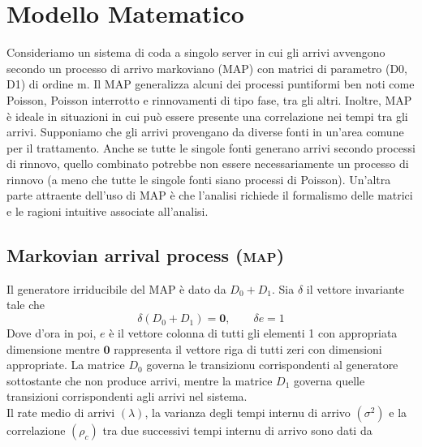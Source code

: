 \documentclass[11pt]{article}
\begin{document}
\clearpage

\section{Modello Matematico}


Consideriamo un sistema di coda a singolo server in cui gli arrivi avvengono secondo un processo di arrivo markoviano (MAP) con matrici di parametro (D0, D1) di ordine m. Il MAP generalizza alcuni dei processi puntiformi ben noti come Poisson, Poisson interrotto e rinnovamenti di tipo fase, tra gli altri. Inoltre, MAP è ideale in situazioni in cui può essere presente una correlazione nei tempi tra gli arrivi. Supponiamo che gli arrivi provengano da diverse fonti in un'area comune per il trattamento. Anche se tutte le singole fonti generano arrivi secondo processi di rinnovo, quello combinato potrebbe non essere necessariamente un processo di rinnovo (a meno che tutte le singole fonti siano processi di Poisson). Un'altra parte attraente dell'uso di MAP è che l'analisi richiede il formalismo delle matrici e le ragioni intuitive associate all'analisi.

\subsection{Markovian arrival process (\textsc{map})}

Il generatore irriducibile del MAP è dato da $D_0 + D_1$. Sia $\delta$ il vettore invariante tale che
\begin{equation} \label{eq:invariant}
    \delta (D_0 + D_1) = \textbf{0}, \qquad \delta e = 1
\end{equation}
Dove d'ora in poi, $e$ è il vettore colonna di tutti gli elementi 1 con appropriata dimensione mentre $\textbf{0}$ rappresenta il vettore riga di tutti zeri con dimensioni appropriate. La matrice $D_0$ governa le transizionu corrispondenti al generatore sottostante che non produce arrivi, mentre la matrice  $D_1$ governa quelle transizioni corrispondenti agli arrivi nel sistema. \\

\noindent Il rate medio di arrivi $(\lambda)$, la varianza degli tempi internu di arrivo
$(\sigma^2)$ e la correlazione $(\rho_c)$ tra due successivi tempi internu di arrivo sono dati da
\end{document}
